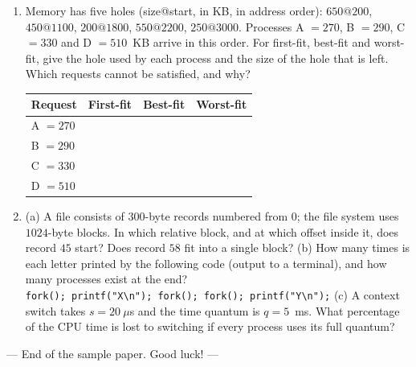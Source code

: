 \documentclass[11pt,a4paper]{article}
\begin{document}
\begin{enumerate}[leftmargin=2.0em,label=C\arabic*.,itemsep=0.5em]
  \newpage
  \item {} Memory has five holes (size@start, in KB, in address order): $650@200$, $450@1100$, $200@1800$, $550@2200$, $250@3000$. Processes A $= 270$, B $= 290$, C $= 330$ and D $= 510$~KB arrive in this order. For first-fit, best-fit and worst-fit, give the hole used by each process and the size of the hole that is left. Which requests cannot be satisfied, and why?
  \begin{center}
  \renewcommand{\arraystretch}{2.0}
  \begin{tabular}{|l|p{4.0cm}|p{4.0cm}|p{4.0cm}|}
  \hline
  \textbf{Request} & \textbf{First-fit} & \textbf{Best-fit} & \textbf{Worst-fit} \\ \hline
  A $= 270$ &&& \\ \hline
  B $= 290$ &&& \\ \hline
  C $= 330$ &&& \\ \hline
  D $= 510$ &&& \\ \hline
  \end{tabular}
  \end{center}
  \ans{2.0cm}

  \item {}
  (a) A file consists of $300$-byte records numbered from $0$; the file system uses $1024$-byte blocks. In which relative block, and at which offset inside it, does record $45$ start? Does record $58$ fit into a single block? 
  \ans{3.0cm}
  (b) How many times is each letter printed by the following code (output to a terminal), and how many processes exist at the end? \\
  \texttt{fork(); printf("X\textbackslash n"); fork(); fork(); printf("Y\textbackslash n");}
  \ans{2.2cm}
  (c) A context switch takes $s = 20\ \mu$s and the time quantum is $q = 5$~ms. What percentage of the CPU time is lost to switching if every process uses its full quantum? 
  \ans{2.0cm}
\end{enumerate}

\vfill
\begin{center}\small\color{muted}--- End of the sample paper. Good luck! ---\end{center}
\end{document}
